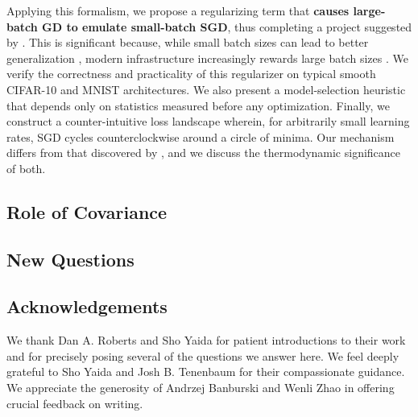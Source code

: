 \documentclass{article}
\newcommand{\sdia}[1]{\begin{gathered}\texttt{[image: ../diagrams/\#1.png]}\end{gathered}}
\begin{document}

    Applying this formalism, we propose a regularizing term that {\bf causes
    large-batch GD to emulate small-batch SGD}, thus completing a project
    suggested by \citet{ro18}.  This is significant because, while small batch
    sizes can lead to better generalization \citep{bo91}, modern infrastructure
    increasingly rewards large batch sizes \citep{go18}.  We verify the
    correctness and practicality of this regularizer on typical smooth CIFAR-10
    and MNIST architectures.  We also present a model-selection heuristic that
    depends only on statistics measured before any optimization.  Finally,
    we construct a counter-intuitive loss landscape wherein, for arbitrarily
    small learning rates, SGD cycles counterclockwise around a circle of
    minima.  Our mechanism differs from that discovered by \citet{ch18}, and we
    discuss the thermodynamic significance of both.
\subsection*{Role of Covariance}

\subsection*{New Questions}


\subsection*{Acknowledgements}
    We thank Dan A. Roberts and Sho Yaida for patient introductions to their
    work and for precisely posing several of the questions we answer here.  We
    feel deeply grateful to Sho Yaida and Josh B. Tenenbaum for their
    compassionate guidance.  We appreciate the generosity of
        Andrzej Banburski
        and
        Wenli Zhao
    in offering crucial feedback on writing.
\end{document}
